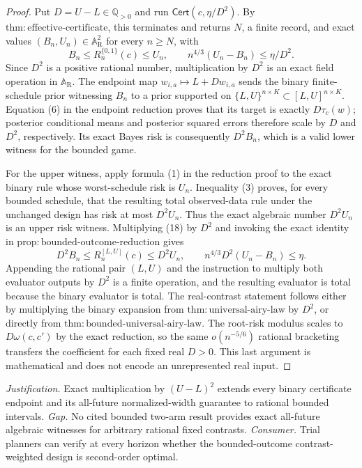 \documentclass{article}
\begin{document}
\begin{proof}
Put \(D=U-L\in\mathbb Q_{>0}\) and run \(\mathsf{Cert}(c,\eta/D^2)\).  By \(\mathrm{thm:effective\text{-}certificate}\), this terminates and returns \(N\), a finite record, and exact values \((B_n,U_n)\in\mathbb A_{\mathrm R}^2\) for every \(n\ge N\), with
\[
B_n\le R_n^{\{0,1\}}(c)\le U_n,
\qquad
n^{4/3}(U_n-B_n)\le\eta/D^2.
\tag{18}
\]
Since \(D^2\) is a positive rational number, multiplication by \(D^2\) is an exact field operation in \(\mathbb A_{\mathrm R}\).  The endpoint map \(w_{i,a}\mapsto L+Dw_{i,a}\) sends the binary finite-schedule prior witnessing \(B_n\) to a prior supported on \(\{L,U\}^{n\times K}\subset[L,U]^{n\times K}\).  Equation (6) in the endpoint reduction proves that its target is exactly \(D\tau_c(w)\); posterior conditional means and posterior squared errors therefore scale by \(D\) and \(D^2\), respectively.  Its exact Bayes risk is consequently \(D^2B_n\), which is a valid lower witness for the bounded game.

For the upper witness, apply formula (1) in the reduction proof to the exact binary rule whose worst-schedule risk is \(U_n\).  Inequality (3) proves, for every bounded schedule, that the resulting total observed-data rule under the unchanged design has risk at most \(D^2U_n\).  Thus the exact algebraic number \(D^2U_n\) is an upper risk witness.  Multiplying (18) by \(D^2\) and invoking the exact identity in \(\mathrm{prop:bounded\text{-}outcome\text{-}reduction}\) gives
\[
D^2B_n\le R_n^{[L,U]}(c)\le D^2U_n,
\qquad
n^{4/3}D^2(U_n-B_n)\le\eta.
\]
Appending the rational pair \((L,U)\) and the instruction to multiply both evaluator outputs by \(D^2\) is a finite operation, and the resulting evaluator is total because the binary evaluator is total.  The real-contrast statement follows either by multiplying the binary expansion from \(\mathrm{thm:universal\text{-}airy\text{-}law}\) by \(D^2\), or directly from \(\mathrm{thm:bounded\text{-}universal\text{-}airy\text{-}law}\).  The root-risk modulus scales to \(D\omega(c,c')\) by the exact reduction, so the same \(o(n^{-5/6})\) rational bracketing transfers the coefficient for each fixed real \(D>0\).  This last argument is mathematical and does not encode an unrepresented real input.
\end{proof}
\par\smallskip\noindent \textit{Justification.} Exact multiplication by \((U-L)^2\) extends every binary certificate endpoint and its all-future normalized-width guarantee to rational bounded intervals. \textit{Gap.} No cited bounded two-arm result provides exact all-future algebraic witnesses for arbitrary rational fixed contrasts. \textit{Consumer.} Trial planners can verify at every horizon whether the bounded-outcome contrast-weighted design is second-order optimal.
\end{document}
